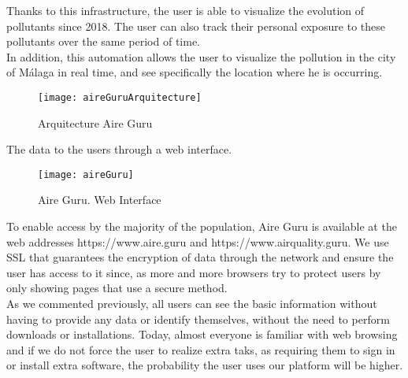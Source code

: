 Thanks to this infrastructure, the user is able to visualize the evolution of pollutants since 2018. The user can also track their personal exposure
 to these pollutants over the same period of time.\\

In addition, this automation allows the user to visualize the pollution in the city of Málaga in real time, and see specifically the location where he is 
occurring. \\

\begin{figure}[ht]
    \centering
    \texttt{[image: aireGuruArquitecture]}
    \caption{Arquitecture Aire Guru}
\end{figure}

The data to the users through a web interface. \\

\begin{figure}[ht]
    \centering
    \texttt{[image: aireGuru]}
    \caption{Aire Guru. Web Interface}
\end{figure}

To enable access by the majority of the population, Aire Guru is available at the web addresses https://www.aire.guru and https://www.airquality.guru.
We use SSL that guarantees the encryption of data through the network and ensure the user has access to it since, as more and more browsers try to protect 
users by only showing pages that use a secure method.\\

As we commented previously, all users can see the basic information without having to provide any data or identify themselves, without the need to
perform downloads or installations. Today, almost everyone is familiar with web browsing and if we do not force the user to realize extra taks, as 
requiring them to sign in or install extra software, the probability the user uses our platform will be higher. 

